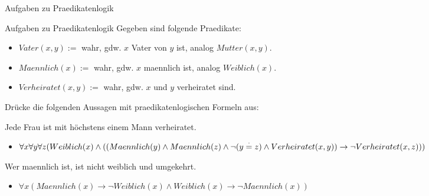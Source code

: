 \documentclass[]{beamer}
\begin{document}
\begin{frame}{Aufgaben zu Praedikatenlogik}
	\begin{taskblock}{Aufgaben zu Praedikatenlogik}
		Gegeben sind folgende Praedikate:
		\begin{itemize}
			\item $Vater(x,y) := $ wahr, gdw. $x$ Vater von $y$ ist, analog $Mutter(x,y)$.
			\item $Maennlich(x) := $ wahr, gdw. $x$ maennlich ist, analog $Weiblich(x)$.
			\item $Verheiratet(x,y) := $ wahr, gdw. $x$ und $y$ verheiratet sind.
		\end{itemize}
		
		
		Drücke die folgenden Aussagen mit praedikatenlogischen Formeln aus:
		
		\begin{itemize}
			\pitem Jede Frau ist mit höchstens einem Mann verheiratet.
			\begin{itemize}
				\pause\item $\forall x \forall y \forall z (Weiblich(x) \land((Maennlich(y) \land Maennlich(z) \land \lnot (y \stackrel{\cdot}{=} z) \land Verheiratet(x,y)) \rightarrow \lnot Verheiratet(x,z)))$
			\end{itemize}
			\pitem Wer maennlich ist, ist nicht weiblich und umgekehrt.
			\begin{itemize}
				\pause\item $\forall x (Maennlich(x) \rightarrow \lnot Weiblich(x) \land Weiblich(x) \rightarrow \lnot Maennlich(x))$
			\end{itemize}
		\end{itemize}
	\end{taskblock}
\end{frame}


\end{document}
